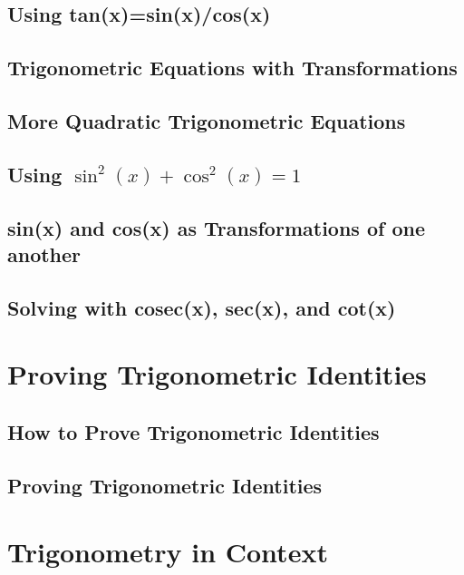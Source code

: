 \documentclass[../alevelmaths.tex]{subfiles}
\begin{document}
\subsection*{Using tan(x)=sin(x)/cos(x)}
\subsection*{Trigonometric Equations with Transformations}
\subsection*{More Quadratic Trigonometric Equations}
\subsection*{Using \texorpdfstring{$\sin^2(x)+\cos^2(x)=1$}{sin squared(x)+cos squared(x)=1}}
\subsection*{sin(x) and cos(x) as Transformations of one another}
\subsection*{Solving with cosec(x), sec(x), and cot(x)}
\section{Proving Trigonometric Identities}
\subsection*{How to Prove Trigonometric Identities}
\subsection*{Proving Trigonometric Identities}
\section{Trigonometry in Context}
\end{document}
